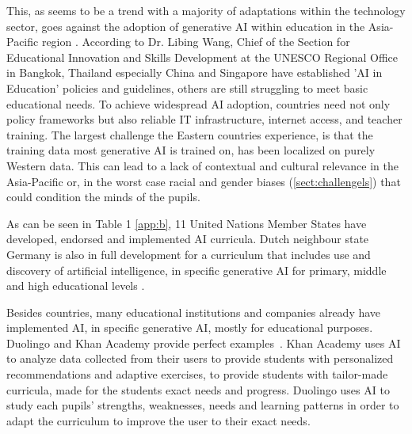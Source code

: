 \documentclass[a4paper,12pt]{report}
\begin{document}
This, as seems to be a trend with a majority of adaptations within the technology sector, goes against the adoption of generative AI within education in the Asia-Pacific region \cite{asian-adoption}. According to Dr. Libing Wang, Chief of the Section for Educational Innovation and Skills Development at the UNESCO Regional Office in Bangkok, Thailand especially China and Singapore have established 'AI in Education' policies and guidelines, others are still struggling to meet basic educational needs. To achieve widespread AI adoption, countries need not only policy frameworks but also reliable IT infrastructure, internet access, and teacher training. The largest challenge the Eastern countries experience, is that the training data most generative AI is trained on, has been localized on purely Western data. This can lead to a lack of contextual and cultural relevance in the Asia-Pacific or, in the worst case racial and gender biases (\ref{sect:challengels}) that could condition the minds of the pupils.

As can be seen in Table 1 \ref{app:b}, 11 United Nations Member States have developed, endorsed and implemented AI curricula. Dutch neighbour state Germany is also in full development for a curriculum that includes use and discovery of artificial intelligence, in specific generative AI for primary, middle and high educational levels \cite{worldwide-adoption}.

Besides countries, many educational institutions and companies already have implemented AI, in specific generative AI, mostly for educational purposes. Duolingo and Khan Academy provide perfect examples~\cite{learning}. Khan Academy uses AI to analyze data collected from their users to provide students with personalized recommendations and adaptive exercises, to provide students with tailor-made curricula, made for the students exact needs and progress. Duolingo uses AI to study each pupils' strengths, weaknesses, needs and learning patterns in order to adapt the curriculum to improve the user to their exact needs.
\end{document}
